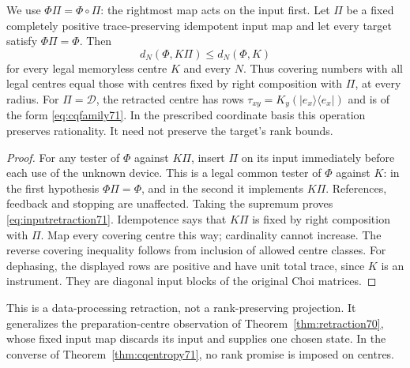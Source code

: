 \begin{proposition}\label{prop:inputretraction71}
We use $\Phi\Pi=\Phi\circ\Pi$: the rightmost map acts on the input first.
Let $\Pi$ be a fixed completely positive trace-preserving idempotent
input map and let every target satisfy $\Phi\Pi=\Phi$. Then
\begin{equation}\label{eq:inputretraction71}
             d_N(\Phi,K\Pi)\le d_N(\Phi,K)
\end{equation}
for every legal memoryless centre $K$ and every $N$. Thus covering
numbers with all legal centres equal those with centres fixed by
right composition with $\Pi$, at every radius.
For $\Pi=\mathcal D$, the retracted centre has rows
$\tau_{xy}=K_y(|e_x\rangle\langle e_x|)$ and is of the form
\eqref{eq:cqfamily71}. In the prescribed coordinate basis this operation
preserves rationality. It need not preserve the target's rank bounds.
\end{proposition}
\begin{proof}
For any tester of $\Phi$ against $K\Pi$, insert $\Pi$ on its input
immediately before each use of the unknown device. This is a legal
common tester of $\Phi$ against $K$: in the first hypothesis
$\Phi\Pi=\Phi$, and in the second it implements $K\Pi$. References,
feedback and stopping are unaffected. Taking the supremum proves
\eqref{eq:inputretraction71}. Idempotence says that $K\Pi$ is fixed
by right composition with $\Pi$. Map every covering centre this way;
cardinality cannot increase. The reverse covering inequality follows
from inclusion of allowed centre classes. For dephasing, the displayed
rows are positive and have unit total trace, since $K$ is an instrument.
They are diagonal input blocks of the original Choi matrices.
\end{proof}
This is a data-processing retraction, not a rank-preserving projection.
It generalizes the preparation-centre observation of
Theorem~\ref{thm:retraction70}, whose fixed input map discards its input
and supplies one chosen state. In the converse of
Theorem~\ref{thm:cqentropy71}, no rank promise is imposed on centres.

